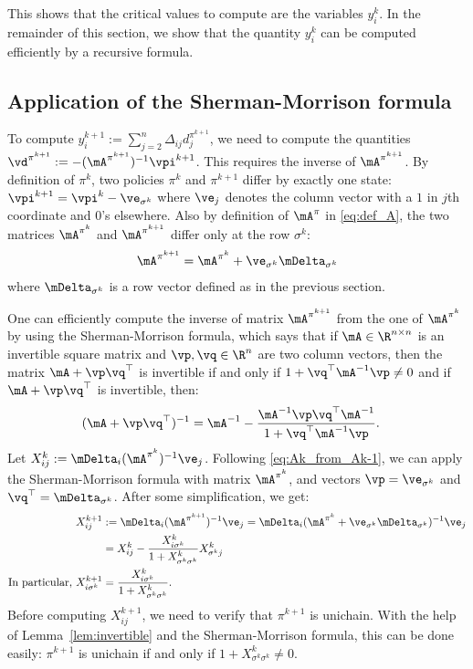 This shows that the critical values to compute are the variables $y^k_i$. In the remainder of this section, we show that the quantity $y^k_i$ can be computed efficiently by a recursive formula.

\subsection{Application of the Sherman-Morrison formula}
\label{ssec:sm_form}

To compute $y^{k+1}_i := \sum_{j=2}^n\Delta_{ij}d_j^{\pi^{k+1}}$, we need to compute the quantities $\vd^{\pi^{k+1}} := -(\mA^{\pi^{k+1}})^{-1}\vpi^{k+1}$.
This requires the inverse of ${\mA^{\pi^{k+1}}}$.
By definition of $\pi^k$, two policies $\pi^k$ and $\pi^{k+1}$ differ by exactly one state: $\vpi^{k+1}=\vpi^k - \ve_{\sigma^k}$ where $\ve_j$ denotes the column vector with a $1$ in $j$th coordinate and $0$'s elsewhere.
Also by definition of $\mA^\pi$ in \eqref{eq:def_A}, the two matrices $\mA^{\pi^k}$ and $\mA^{\pi^{k+1}}$ differ only at the row $\sigma^k$:
\begin{align}
    \mA^{\pi^{k+1}} = \mA^{\pi^k} + \ve_{\sigma^k} \mDelta_{\sigma^k}
    \label{eq:Ak_from_Ak-1}
\end{align}
where $\mDelta_{\sigma^k}$ is a row vector defined as in the previous section.

One can efficiently compute the inverse of matrix $\mA^{\pi^{k+1}}$ from the one of $\mA^{\pi^k}$ by using the Sherman-Morrison formula, which says that if $\mA\in\R^{n\times n}$ is an invertible square matrix and $\vp, \vq\in\R^n$ are two column vectors, then the matrix $\mA+\vp\vq^\top$ is invertible if and only if $1+\vq^\top \mA^{-1}\vp\neq0$ and if $\mA+\vp\vq^\top$ is invertible, then:
\begin{align*}
    (\mA + \vp\vq^\top)^{-1}
    &=\mA^{-1} - \frac{\mA^{-1}\vp\vq^\top \mA^{-1}}{1+\vq^\top \mA^{-1}\vp}.
\end{align*}
Let $X^k_{ij} := \mDelta_i (\mA^{\pi^k})^{-1}\ve_j$. Following \eqref{eq:Ak_from_Ak-1}, we can apply the Sherman-Morrison formula with matrix $\mA^{\pi^k}$, and vectors $\vp=\ve_{\sigma^k}$ and $\vq^\top=\mDelta_{\sigma^k}$. After some simplification, we get:
\begin{align}
    X^{k+1}_{ij} &:= \mDelta_i (\mA^{\pi^{k+1}})^{-1}\ve_j =\mDelta_i (\mA^{\pi^k}+\ve_{\sigma^k}\mDelta_{\sigma^k})^{-1}\ve_j\nonumber\\
                 &= X^{k}_{ij} - \frac{X^{k}_{i\sigma^k} }{1+X^{k}_{\sigma^k \sigma^k}}X^{k}_{\sigma^k j} \label{eq:X^k+1-i} \\
    \text{In particular,}\ X^{k+1}_{i\sigma^k} &=\frac{X^{k}_{i\sigma^k}}{1+X^{k}_{\sigma^k \sigma^k}}.\nonumber
\end{align}
Before computing $X^{k+1}_{ij}$, we need to verify that $\pi^{k+1}$ is unichain.
With the help of Lemma~\ref{lem:invertible} and the Sherman-Morrison formula, this can be done easily: $\pi^{k+1}$ is unichain if and only if $1+X^k_{\sigma^k\sigma^k}\neq0$. 

